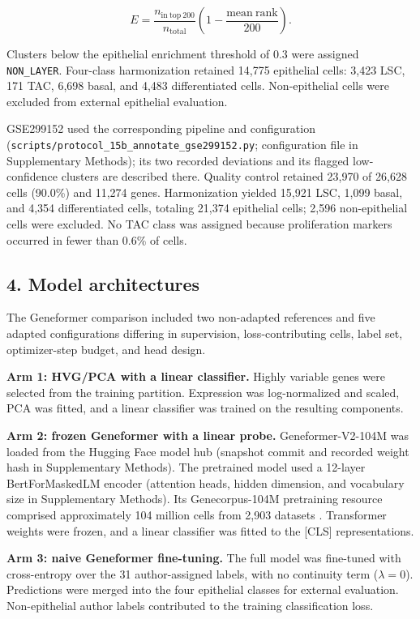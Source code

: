 \documentclass[12pt,letterpaper]{article}
\begin{document}
\[
E = \frac{n_{\mathrm{in\ top\ 200}}}{n_{\mathrm{total}}}
\left(1-\frac{\mathrm{mean\ rank}}{200}\right).
\]

Clusters below the epithelial enrichment threshold of 0.3 were assigned \texttt{NON\_\allowbreak LAYER}. Four-class harmonization retained 14,775 epithelial cells: 3,423 LSC, 171 TAC, 6,698 basal, and 4,483 differentiated cells. Non-epithelial cells were excluded from external epithelial evaluation.

GSE299152 used the corresponding pipeline and configuration (\texttt{scripts/\allowbreak protocol\_\allowbreak 15b\_\allowbreak annotate\_\allowbreak gse299152.py}; configuration file in Supplementary Methods); its two recorded deviations and its flagged low-confidence clusters are described there. Quality control retained 23,970 of 26,628 cells (90.0\%) and 11,274 genes. Harmonization yielded 15,921 LSC, 1,099 basal, and 4,354 differentiated cells, totaling 21,374 epithelial cells; 2,596 non-epithelial cells were excluded. No TAC class was assigned because proliferation markers occurred in fewer than 0.6\% of cells.

\subsection*{4. Model architectures}

The Geneformer comparison included two non-adapted references and five adapted configurations differing in supervision, loss-contributing cells, label set, optimizer-step budget, and head design.

\textbf{Arm 1: HVG/PCA with a linear classifier.} Highly variable genes were selected from the training partition. Expression was log-normalized and scaled, PCA was fitted, and a linear classifier was trained on the resulting components.

\textbf{Arm 2: frozen Geneformer with a linear probe.} Geneformer-V2-104M was loaded from the Hugging Face model hub (snapshot commit and recorded weight hash in Supplementary Methods). The pretrained model used a 12-layer BertForMaskedLM encoder (attention heads, hidden dimension, and vocabulary size in Supplementary Methods). Its Genecorpus-104M pretraining resource comprised approximately 104 million cells from 2,903 datasets \cite{theodoris2023,chen2026natcompsci}. Transformer weights were frozen, and a linear classifier was fitted to the [CLS] representations.

\textbf{Arm 3: naive Geneformer fine-tuning.} The full model was fine-tuned with cross-entropy over the 31 author-assigned labels, with no continuity term ($\lambda=0$). Predictions were merged into the four epithelial classes for external evaluation. Non-epithelial author labels contributed to the training classification loss.
\end{document}
